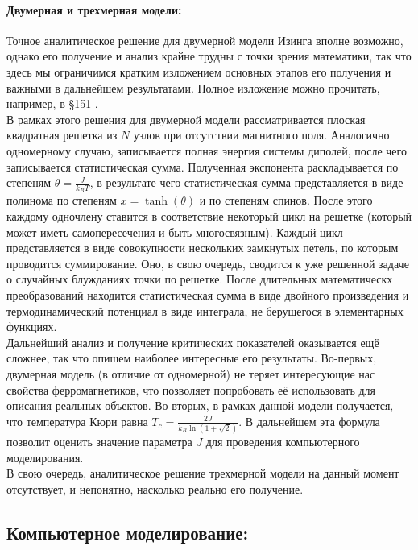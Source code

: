\documentclass[oneside,final,14pt]{extarticle}
\begin{document}
	\newpage 
	\paragraph{Двумерная и трехмерная модели:}
	Точное аналитическое решение для двумерной модели Изинга вполне возможно, однако его получение и анализ крайне трудны с точки зрения математики, так что здесь мы ограничимся кратким изложением основных этапов его получения и важными в дальнейшем результатами. Полное изложение можно прочитать, например, в \S 151 \cite{land5}. \\
	
	\noindent В рамках этого решения для двумерной модели рассматривается плоская квадратная решетка из $N$ узлов при отсутствии магнитного поля. Аналогично одномерному случаю, записывается полная энергия системы диполей, после чего записывается статистическая сумма. Полученная экспонента раскладывается по степеням $\theta = \frac{J}{k_{B}T}$, в результате чего статистическая сумма представляется в виде полинома по степеням $x=\tanh(\theta)$ и по степеням спинов. После этого каждому одночлену ставится в соответствие некоторый цикл на решетке (который может иметь самопересечения и быть многосвязным). Каждый цикл представляется в виде совокупности нескольких замкнутых петель, по которым проводится суммирование. Оно, в свою очередь, сводится к уже решенной задаче о случайных блужданиях точки по решетке. После длительных математическх преобразований находится статистическая сумма в виде двойного произведения и термодинамический потенциал в виде интеграла, не берущегося в элементарных функциях. \\
	
	\noindent Дальнейший анализ и получение критических показателей оказывается ещё сложнее, так что опишем наиболее интересные его результаты. Во-первых, двумерная модель (в отличие от одномерной) не теряет интересующие нас свойства ферромагнетиков, что позволяет попробовать её использовать для описания реальных объектов. Во-вторых, в рамках данной модели получается, что температура Кюри равна $T_{c}=\frac{2J}{k_{B}\ln(1+\sqrt{2})}$. В дальнейшем эта формула позволит оценить значение параметра $J$ для проведения компьютерного моделирования. \\
	
	\noindent В свою очередь, аналитическое решение трехмерной модели на данный момент отсутствует, и непонятно, насколько реально его получение.
	
	\newpage
	\subsection{Компьютерное моделирование:}
\end{document}
